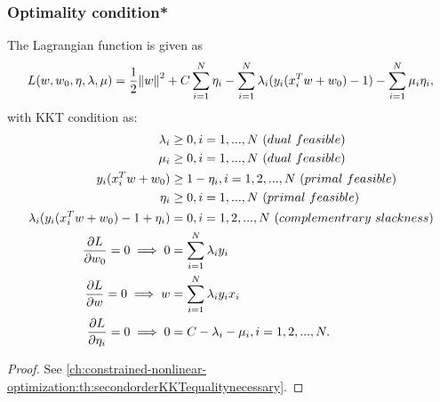 \begin{refsection}
\subsubsection{Optimality condition*}

\begin{lemma}\cite[332]{bishop2006pattern}
	The Lagrangian function is given as
	$$L(w,w_0,\eta,\lambda, \mu) = \frac{1}{2}\norm{w}^2 + C\sum_{i=1}^N \eta_i - \sum_{i=1}^N \lambda_i(y_i(x_i^Tw + w_0) - 1) - \sum_{i=1}^N \mu_i\eta_i,$$
	with KKT condition as:
	\begin{align*}
	\lambda_i &\geq 0,i=1,...,N ~(dual~ feasible)\\
	\mu_i &\geq 0,i=1,...,N ~(dual~feasible)\\
	y_i(x_i^Tw + w_0) &\geq 1 - \eta_i,i=1,2,...,N ~(primal~feasible)\\
	\eta_i &\geq 0, i=1,...,N ~(primal~feasible)\\
	\lambda_i(y_i(x_i^Tw + w_0) - 1 + \eta_i) &= 0,i=1,2,...,N ~(complementrary~slackness)\\
	\frac{\partial L}{\partial w_0} = 0 \implies 0 &= \sum_{i=1}^N \lambda_iy_i\\
	\frac{\partial L}{\partial w} = 0 \implies w &= \sum_{i=1}^N \lambda_iy_ix_i\\
	\frac{\partial L}{\partial \eta_i} = 0 \implies 0 &= C-\lambda_i-\mu_i, i=1,2,...,N.
	\end{align*}
\end{lemma}
\begin{proof}
	See \autoref{ch:constrained-nonlinear-optimization:th:secondorderKKTequalitynecessary}.
\end{proof}


\end{refsection}
